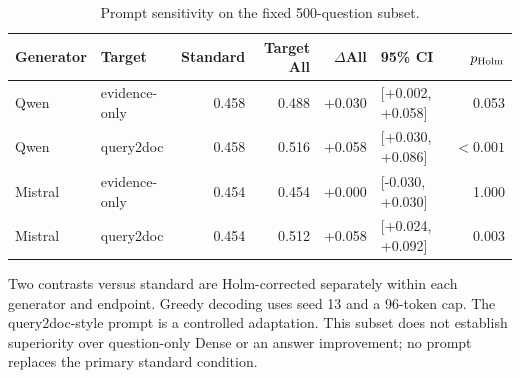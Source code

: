 \begin{table}[!htbp]
\centering\footnotesize
\caption{Prompt sensitivity on the fixed 500-question subset.}
\label{tab:mhrag_prompts}
\begin{threeparttable}
\setlength{\tabcolsep}{3pt}
\begin{tabular}{llrrrlr}
\toprule
Generator & Target & Standard & Target All & $\Delta$All & 95\% CI & $p_{\rm Holm}$ \\
\midrule
Qwen & evidence-only & 0.458 & 0.488 & +0.030 & [+0.002, +0.058] & 0.053 \\
Qwen & query2doc & 0.458 & 0.516 & +0.058 & [+0.030, +0.086] & $<0.001$ \\
Mistral & evidence-only & 0.454 & 0.454 & +0.000 & [-0.030, +0.030] & 1.000 \\
Mistral & query2doc & 0.454 & 0.512 & +0.058 & [+0.024, +0.092] & 0.003 \\
\bottomrule
\end{tabular}
\begin{tablenotes}\scriptsize\item Two contrasts versus standard are Holm-corrected separately within each generator and endpoint. Greedy decoding uses seed 13 and a 96-token cap. The query2doc-style prompt is a controlled adaptation. This subset does not establish superiority over question-only Dense or an answer improvement; no prompt replaces the primary standard condition.
\end{tablenotes}
\end{threeparttable}
\end{table}
